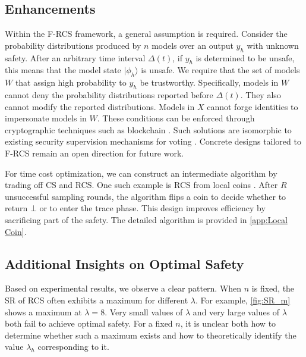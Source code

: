 \documentclass[11pt]{article}
\begin{document}
\subsection{Enhancements}

Within the F-RCS framework, a general assumption is required. Consider the probability distributions produced by $n$ models over an output $y_h$ with unknown safety. After an arbitrary time interval $\Delta(t)$, if $y_h$ is determined to be unsafe, this means that the model state $\lvert \phi_h \rangle$ is unsafe. We require that the set of models $W$ that assign high probability to $y_h$ be trustworthy. Specifically, models in $W$ cannot deny the probability distributions reported before $\Delta(t)$. They also cannot modify the reported distributions. Models in $X$ cannot forge identities to impersonate models in $W$. These conditions can be enforced through cryptographic techniques such as blockchain \citep{Li2023FISCOBCOS, authors2018Fabric}. Such solutions are isomorphic to existing security supervision mechanisms for voting \citep{yang2021priscore}. Concrete designs tailored to F-RCS remain an open direction for future work.

For time cost optimization, we can construct an intermediate algorithm by trading off CS and RCS. One such example is RCS from local coins \citep{zhang2023waterbear}. After $R$ unsuccessful sampling rounds, the algorithm flips a coin to decide whether to return $\bot$ or to enter the trace phase. This design improves efficiency by sacrificing part of the safety. The detailed algorithm is provided in \autoref{app:Local Coin}.

\subsection{Additional Insights on Optimal Safety}

Based on experimental results, we observe a clear pattern. When $n$ is fixed, the SR of RCS often exhibits a maximum for different $\lambda$. For example, \autoref{fig:SR_m} shows a maximum at $\lambda = 8$. Very small values of $\lambda$ and very large values of $\lambda$ both fail to achieve optimal safety. For a fixed $n$, it is unclear both how to determine whether such a maximum exists and how to theoretically identify the value $\lambda_h$ corresponding to it.






\end{document}
